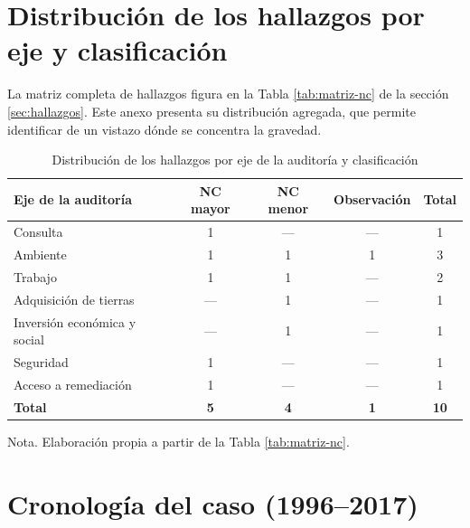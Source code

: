 \section{Distribución de los hallazgos por eje y clasificación}
\label{anexo:matriz}

La matriz completa de hallazgos figura en la Tabla \ref{tab:matriz-nc} de la
sección \ref{sec:hallazgos}. Este anexo presenta su distribución agregada, que
permite identificar de un vistazo dónde se concentra la gravedad.

\begin{table}[H]
  \centering
  \caption{Distribución de los hallazgos por eje de la auditoría y clasificación}
  \label{tab:distribucion}
  \begin{small}
  \begin{tabular}{@{}l c c c c@{}}
    \toprule
    \textbf{Eje de la auditoría} & \textbf{NC mayor} & \textbf{NC menor}
      & \textbf{Observación} & \textbf{Total} \\
    \midrule
    Consulta                     & 1 & --- & --- & 1 \\
    Ambiente                     & 1 & 1   & 1   & 3 \\
    Trabajo                      & 1 & 1   & --- & 2 \\
    Adquisición de tierras       & --- & 1 & --- & 1 \\
    Inversión económica y social & --- & 1 & --- & 1 \\
    Seguridad                    & 1 & --- & --- & 1 \\
    Acceso a remediación         & 1 & --- & --- & 1 \\
    \midrule
    \textbf{Total}               & \textbf{5} & \textbf{4} & \textbf{1} & \textbf{10} \\
    \bottomrule
  \end{tabular}
  \end{small}
  \par\vspace{3pt}
  \raggedright\footnotesize
  Nota. Elaboración propia a partir de la Tabla \ref{tab:matriz-nc}.
\end{table}

\section{Cronología del caso (1996--2017)}
\label{anexo:cronologia}

